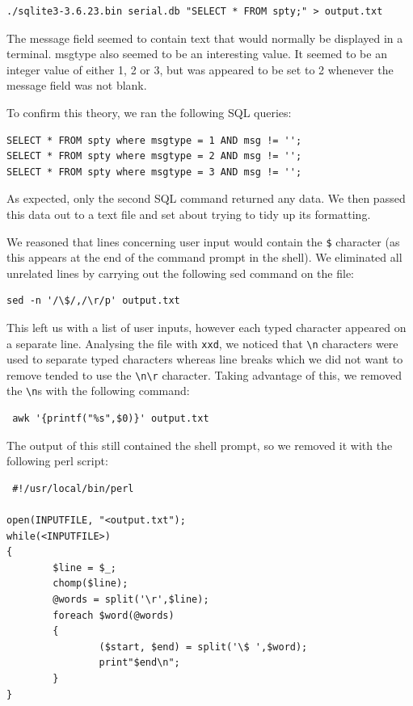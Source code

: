 \documentclass[a4paper,
    11pt,
    normalheadings,
    parindent,
    UKenglish,
    abstracton,
    ]{scrartcl}
\begin{document}
\begin{verbatim}
./sqlite3-3.6.23.bin serial.db "SELECT * FROM spty;" > output.txt
\end{verbatim}

The message field seemed to contain text that would normally be displayed in a terminal.
msgtype also seemed to be an interesting value.
It seemed to be an integer value of either 1, 2 or 3, but was appeared to be set to 2 whenever the message field was not blank.

To confirm this theory, we ran the following SQL queries:
\begin{verbatim}
SELECT * FROM spty where msgtype = 1 AND msg != '';
SELECT * FROM spty where msgtype = 2 AND msg != '';
SELECT * FROM spty where msgtype = 3 AND msg != '';
\end{verbatim}

As expected, only the second SQL command returned any data.
We then passed this data out to a text file and set about trying to tidy up its formatting.

We reasoned that lines concerning user input would contain the \texttt{\$} character (as this appears at the end of the command prompt in the shell).
We eliminated all unrelated lines by carrying out the following sed command on the file:
\begin{verbatim}
sed -n '/\$/,/\r/p' output.txt
\end{verbatim}

This left us with a list of user inputs, however each typed character appeared on a separate line.
Analysing the file with \texttt{xxd}, we noticed that \texttt{\textbackslash{}n} characters were used to separate typed characters whereas line breaks which we did not want to remove tended to use the \texttt{\textbackslash{}n\textbackslash{}r} character.
Taking advantage of this, we removed the \texttt{\textbackslash{}n}s with the following command:
\begin{verbatim}
 awk '{printf("%s",$0)}' output.txt
 \end{verbatim}

 The output of this still contained the shell prompt, so we removed it with the following perl script:
 \begin{verbatim}
 #!/usr/local/bin/perl

open(INPUTFILE, "<output.txt");
while(<INPUTFILE>)
{
        $line = $_;
        chomp($line);
        @words = split('\r',$line);
        foreach $word(@words)
        {
                ($start, $end) = split('\$ ',$word);
                print"$end\n";
        }
}
\end{verbatim}
\end{document}
